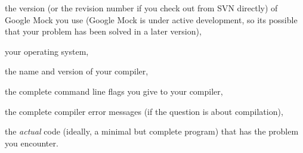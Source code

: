 \begin{DoxyItemize}
\item the version (or the revision number if you check out from S\+VN directly) of Google Mock you use (Google Mock is under active development, so it\textquotesingle{}s possible that your problem has been solved in a later version),
\item your operating system,
\item the name and version of your compiler,
\item the complete command line flags you give to your compiler,
\item the complete compiler error messages (if the question is about compilation),
\item the {\itshape actual} code (ideally, a minimal but complete program) that has the problem you encounter. 
\end{DoxyItemize}